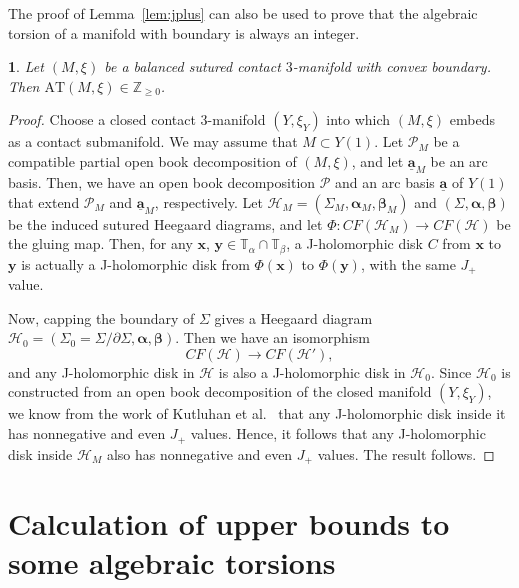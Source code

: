 \documentclass[11pt,oneside,english]{amsart}
\numberwithin{equation}{section}
\numberwithin{figure}{section}
\theoremstyle{definition}
\theoremstyle{plain}
\theoremstyle{plain}
\newtheorem{lem}[thm]{\protect\lemmaname}
\theoremstyle{remark}
\theoremstyle{plain}
\providecommand{\lemmaname}{Lemma}
\begin{document}
The proof of Lemma~\ref{lem:jplus} can also be used to prove that the algebraic
torsion of a manifold with boundary is always an integer.

\begin{lem}
Let $(M,\xi)$ be a balanced sutured contact $3$-manifold
with convex boundary. Then $\mbox{AT}(M,\xi)\in\mathbb{Z}_{\ge0}$.
\end{lem}

\begin{proof}
Choose a closed contact $3$-manifold $(Y,\xi_Y)$
into which $(M,\xi)$ embeds as a contact submanifold. We may
assume that $M \subset Y(1)$. Let $\mathcal{P}_{M}$ be a compatible
partial open book decomposition of $(M,\xi)$, and let $\underline{\mathbf{a}}_{M}$
be an arc basis. Then, we have an open book decomposition $\mathcal{P}$
and an arc basis $\underline{\mathbf{a}}$ of $Y(1)$ that extend
$\mathcal{P}_{M}$ and $\underline{\mathbf{a}}_{M}$, respectively.
Let ${\mathcal{H}}_M = (\Sigma_{M},{\boldsymbol{\alpha}}_{M},{\boldsymbol{\beta}}_{M})$
and $(\Sigma,{\boldsymbol{\alpha}},{\boldsymbol{\beta}})$ be the induced sutured Heegaard diagrams, and let
$\Phi \colon {\mathit{CF}}({\mathcal{H}}_M) \rightarrow {\mathit{CF}}({\mathcal{H}})$ be the gluing map. Then, for any $\mathbf{x}$, $\mathbf{y} \in \mathbb{T}_{\alpha} \cap\mathbb{T}_{\beta}$,
a J-holomorphic disk $C$ from $\mathbf{x}$ to $\mathbf{y}$ is actually
a J-holomorphic disk from $\Phi(\mathbf{x})$ to $\Phi(\mathbf{y})$,
with the same $J_{+}$ value.

Now, capping the boundary of $\Sigma$ gives a Heegaard diagram ${\mathcal{H}}_0 = (\Sigma_{0}=\Sigma/\partial\Sigma,{\boldsymbol{\alpha}},{\boldsymbol{\beta}})$.
Then we have an isomorphism
\[
{\mathit{CF}}({\mathcal{H}}) \rightarrow {\mathit{CF}}({\mathcal{H}}'),
\]
and any J-holomorphic disk in ${\mathcal{H}}$ is also a J-holomorphic disk in ${\mathcal{H}}_0$.
Since ${\mathcal{H}}_0$ is constructed from an open book decomposition of the closed manifold $(Y,\xi_Y)$,
we know from the work of Kutluhan et al.~\cite{key-10} that any J-holomorphic disk inside it
has nonnegative and even $J_{+}$ values. Hence, it follows that any
J-holomorphic disk inside ${\mathcal{H}}_M$ also has nonnegative and even $J_{+}$ values. The result follows.
\end{proof}

\section{Calculation of upper bounds to some algebraic torsions} \label{sec:gt}
\end{document}
